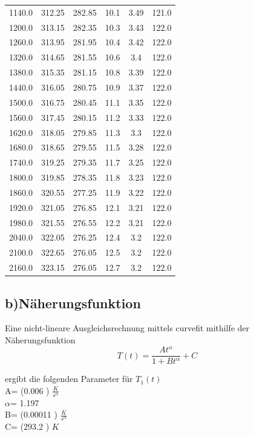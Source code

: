 \begin{table}
\begin{tabular}{cccccc}
1140.0 & 312.25 & 282.85 & 10.1 & 3.49 & 121.0 \\
1200.0 & 313.15 & 282.35 & 10.3 & 3.43 & 122.0 \\
1260.0 & 313.95 & 281.95 & 10.4 & 3.42 & 122.0 \\
1320.0 & 314.65 & 281.55 & 10.6 & 3.4 & 122.0 \\
1380.0 & 315.35 & 281.15 & 10.8 & 3.39 & 122.0 \\
1440.0 & 316.05 & 280.75 & 10.9 & 3.37 & 122.0 \\
1500.0 & 316.75 & 280.45 & 11.1 & 3.35 & 122.0 \\
1560.0 & 317.45 & 280.15 & 11.2 & 3.33 & 122.0 \\
1620.0 & 318.05 & 279.85 & 11.3 & 3.3 & 122.0 \\
1680.0 & 318.65 & 279.55 & 11.5 & 3.28 & 122.0 \\
1740.0 & 319.25 & 279.35 & 11.7 & 3.25 & 122.0 \\
1800.0 & 319.85 & 278.35 & 11.8 & 3.23 & 122.0 \\
1860.0 & 320.55 & 277.25 & 11.9 & 3.22 & 122.0 \\
1920.0 & 321.05 & 276.85 & 12.1 & 3.21 & 122.0 \\
1980.0 & 321.55 & 276.55 & 12.2 & 3.21 & 122.0 \\
2040.0 & 322.05 & 276.25 & 12.4 & 3.2 & 122.0 \\
2100.0 & 322.65 & 276.05 & 12.5 & 3.2 & 122.0 \\
2160.0 & 323.15 & 276.05 & 12.7 & 3.2 & 122.0 \\
\end{tabular}
\end{table}
\newpage
\subsection{b)Näherungsfunktion}
Eine nicht-lineare Ausgleichsrechnung mittels curvefit mithilfe der Näherungsfunktion
\begin{equation}
\label{eqn:naeherungsfunktion}
T(t)=\frac{At^\alpha}{1+Bt^\alpha}+C
\end{equation}

ergibt die folgenden Parameter
für $T_1(t)$\\

A= (0.006 ) $\frac{K}{s^\alpha}$ \\
$\alpha$= 1.197  \\
B= (0.00011 ) $\frac{K}{s^\alpha}$\\
C= (293.2 ) $K$ \\

